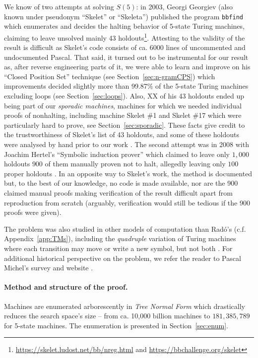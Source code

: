 \documentclass[a4paper,british]{article}
\theoremstyle{definition} %
\numberwithin{equation}{section}
\theoremstyle{definition} %
\newcommand{\ts}[1]{{\color{red}#1}}
\newcommand{\BBtheFifthTNF}{181{,}385{,}789}
\newcommand{\rado}{Rad\'o\xspace}
\begin{document}
\newcommand{\SkeletHoldoutsSporadic}{\ts{XX}\xspace}

We know of two attempts at solving $S(5)$: in 2003, Georgi Georgiev (also known under pseudonym ``Skelet'' or ``Skeleta'') published the program \texttt{bbfind} \cite{Skelet_bbfind} which enumerates and decides the halting behavior of 5-state Turing machines, claiming to leave unsolved mainly 43 holdouts\footnote{\url{https://skelet.ludost.net/bb/nreg.html} and \url{https://bbchallenge.org/skelet}}. Attesting to the validity of the result is difficult as Skelet's code consists of ca. 6000 lines of uncommented and undocumented Pascal. That said, it turned out to be instrumental for our result as, after reverse engineering parts of it, we were able to learn and improve on his ``Closed Position Set'' technique (see Section~\ref{sec:n-gramCPS}) which improvements decided slightly more than 99.87\% of the 5-state Turing machines excluding loops (see Section~\ref{sec:loops}). Also, \SkeletHoldoutsSporadic of his 43 holdouts ended up being part of our \textit{sporadic machines}, \ie machines for which we needed individual proofs of nonhalting, including machine Skelet \#1 and Skelet \#17 which were particularly hard to prove, see Section~\ref{sec:sporadic}. These facts give credit to the trustworthiness of Skelet's list of 43 holdouts, and some of these holdouts were analysed by hand prior to our work \cite{DanBriggs}. The second attempt was in 2008 with Joachim Hertel's ``Symbolic induction prover'' which claimed to leave only $1{,}000$ holdouts $900$ of them manually proven not to halt, allegedly leaving only $100$ proper holdouts \cite{Hertel}. In an opposite way to Skelet's work, the method is documented but, to the best of our knowledge, no code is made available, nor are the 900 claimed manual proofs making verification of the result difficult apart from reproduction from scratch (arguably, verification would still be tedious if the 900 proofs were given).

The \BBfull problem was also studied in other models of computation than \rado's (c.f. Appendix~\ref{app:TMs}), including the \textit{quadruple} variation of Turing machines where each transition may move or write a new symbol, but not both \cite{Ross2003,Ross2005}. For additional historical perspective on the \BBfull problem, we refer the reader to Pascal Michel's survey and website \cite{michel2019busy,PMichel_website}.

\paragraph{Method and structure of the proof.} Machines are enumerated arborescently in \textit{Tree Normal Form} \cite{Brady64} which drastically reduces the search space's size -- \eg from ca. 10,000 billion machines to $\BBtheFifthTNF$ for 5-state machines. The enumeration is presented in Section~\ref{sec:enum}.
\end{document}

